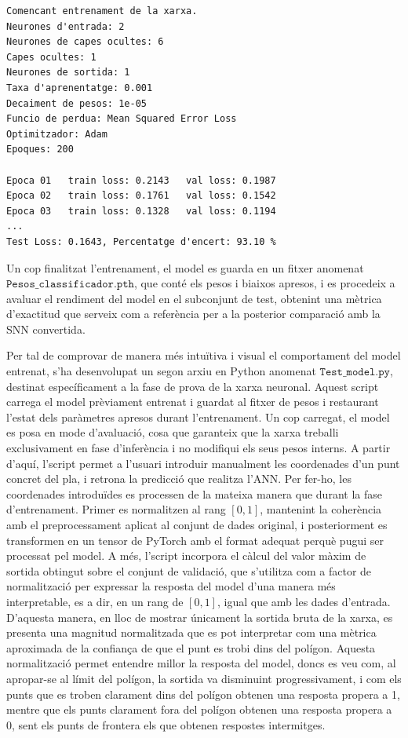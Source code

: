 \documentclass[a4paper,11pt, titlepage, twoside]{article}
\begin{document}
\vspace{2mm}

\begin{lstlisting}[style=logs, caption={Fragment dels logs d'entrenament de la ANN}, captionpos=b, label={lst:logs_ann}]
Comencant entrenament de la xarxa.
Neurones d'entrada: 2
Neurones de capes ocultes: 6
Capes ocultes: 1
Neurones de sortida: 1
Taxa d'aprenentatge: 0.001
Decaiment de pesos: 1e-05
Funcio de perdua: Mean Squared Error Loss
Optimitzador: Adam
Epoques: 200

Epoca 01   train loss: 0.2143   val loss: 0.1987
Epoca 02   train loss: 0.1761   val loss: 0.1542
Epoca 03   train loss: 0.1328   val loss: 0.1194
...
Test Loss: 0.1643, Percentatge d'encert: 93.10 %
\end{lstlisting}

Un cop finalitzat l'entrenament, el model es guarda en un fitxer anomenat $\texttt{Pesos\_classificador.pth}$, que conté els pesos i biaixos apresos, i es procedeix a avaluar el rendiment del model en el subconjunt de test, obtenint una mètrica d'exactitud que serveix com a referència per a la posterior comparació amb la SNN convertida.

Per tal de comprovar de manera més intuïtiva i visual el comportament del model entrenat, s'ha desenvolupat un segon arxiu en Python anomenat $\texttt{Test\_model.py}$, destinat específicament a la fase de prova de la xarxa neuronal. Aquest script carrega el model prèviament entrenat i guardat al fitxer de pesos i restaurant l'estat dels paràmetres apresos durant l'entrenament. Un cop carregat, el model es posa en mode d'avaluació, cosa que garanteix que la xarxa treballi exclusivament en fase d'inferència i no modifiqui els seus pesos interns. A partir d'aquí, l'script permet a l'usuari introduir manualment les coordenades d'un punt concret del pla, i retrona la predicció que realitza l'ANN. Per fer-ho, les coordenades introduïdes es processen de la mateixa manera que durant la fase d'entrenament. Primer es normalitzen al rang $[0,1]$, mantenint la coherència amb el preprocessament aplicat al conjunt de dades original, i posteriorment es transformen en un tensor de PyTorch amb el format adequat perquè pugui ser processat pel model. A més, l'script incorpora el càlcul del valor màxim de sortida obtingut sobre el conjunt de validació, que s'utilitza com a factor de normalització per expressar la resposta del model d'una manera més interpretable, es a dir, en un rang de $[0,1]$, igual que amb les dades d'entrada. D'aquesta manera, en lloc de mostrar únicament la sortida bruta de la xarxa, es presenta una magnitud normalitzada que es pot interpretar com una mètrica aproximada de la confiança de que el punt es trobi dins del polígon. Aquesta normalització permet entendre millor la resposta del model, doncs es veu com, al apropar-se al límit del polígon, la sortida va disminuint progressivament, i com els punts que es troben clarament dins del polígon obtenen una resposta propera a 1, mentre que els punts clarament fora del polígon obtenen una resposta propera a 0, sent els punts de frontera els que obtenen respostes intermitges.
\end{document}
